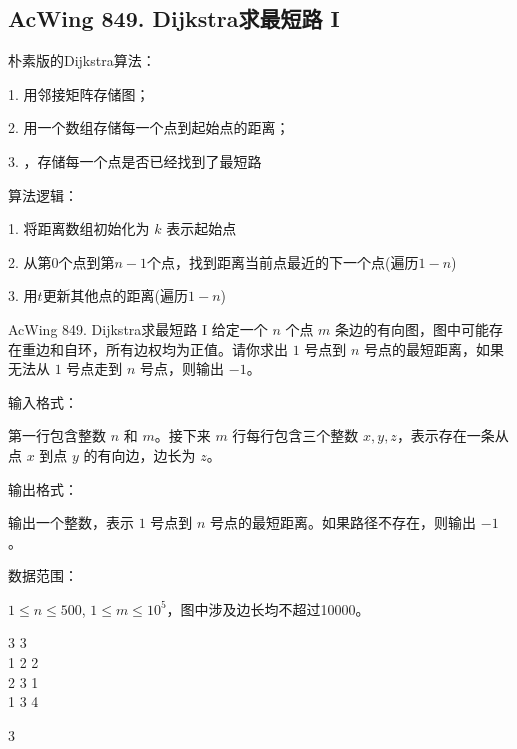 \subsection{AcWing 849. Dijkstra求最短路 I}

朴素版的Dijkstra算法：

1. 用邻接矩阵存储图；

2. 用一个数组存储每一个点到起始点的距离；

3. ，存储每一个点是否已经找到了最短路

算法逻辑：

1. 将距离数组初始化为 $k$ 表示起始点

2. 从第$0$个点到第$n - 1$个点，找到距离当前点最近的下一个点(遍历$1 - n$) 

3. 用$t$更新其他点的距离(遍历$1 - n$)


\begin{titledbox}{AcWing 849. Dijkstra求最短路 I}
    给定一个 $n$ 个点 $m$ 条边的有向图，图中可能存在重边和自环，所有边权均为正值。请你求出 $1$ 号点到 $n$ 号点的最短距离，如果无法从 $1$ 号点走到 $n$ 号点，则输出 $-1$。

    输入格式：

    第一行包含整数 $n$ 和 $m$。接下来 $m$ 行每行包含三个整数 $x,y,z$，表示存在一条从点 $x$ 到点 $y$ 的有向边，边长为 $z$。

    输出格式：

    输出一个整数，表示 $1$ 号点到 $n$ 号点的最短距离。如果路径不存在，则输出 $-1$。

    数据范围：

    $1 \le n \le 500$, $1 \le m \le 10^5$，图中涉及边长均不超过10000。

    \begin{inputblock}
        3 3 \\
        1 2 2 \\
        2 3 1 \\
        1 3 4
    \end{inputblock}
    \begin{outputblock}
        3
    \end{outputblock}
\end{titledbox}

